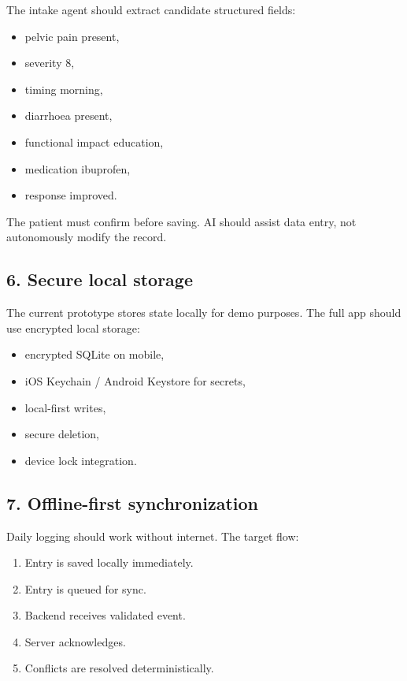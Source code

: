 \documentclass[11pt,a4paper]{article}
\begin{document}
The intake agent should extract candidate structured fields:

\begin{itemize}
  \item pelvic pain present,
  \item severity 8,
  \item timing morning,
  \item diarrhoea present,
  \item functional impact education,
  \item medication ibuprofen,
  \item response improved.
\end{itemize}

The patient must confirm before saving. AI should assist data entry, not autonomously modify the record.

\subsection{6. Secure local storage}

The current prototype stores state locally for demo purposes. The full app should use encrypted local storage:

\begin{itemize}
  \item encrypted SQLite on mobile,
  \item iOS Keychain / Android Keystore for secrets,
  \item local-first writes,
  \item secure deletion,
  \item device lock integration.
\end{itemize}

\subsection{7. Offline-first synchronization}

Daily logging should work without internet. The target flow:

\begin{enumerate}
  \item Entry is saved locally immediately.
  \item Entry is queued for sync.
  \item Backend receives validated event.
  \item Server acknowledges.
  \item Conflicts are resolved deterministically.
\end{enumerate}
\end{document}
